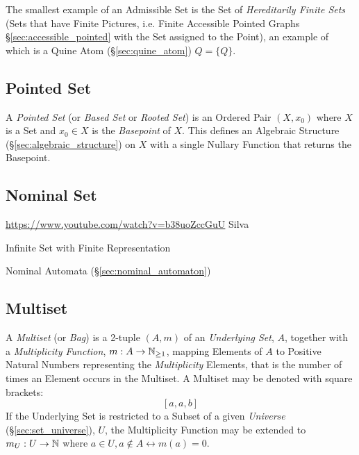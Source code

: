 The smallest example of an Admissible Set is the Set of \emph{Hereditarily
  Finite Sets} (Sets that have Finite Pictures, i.e. Finite Accessible Pointed
Graphs \S\ref{sec:accessible_pointed} with the Set assigned to the Point), an
example of which is a Quine Atom (\S\ref{sec:quine_atom}) $Q = \{Q\}$.
\cite{aczel88} %



\subsection{Pointed Set}\label{sec:pointed_set}

A \emph{Pointed Set} (or \emph{Based Set} or \emph{Rooted Set}) is an Ordered
Pair $(X, x_0)$ where $X$ is a Set and $x_0 \in X$ is the \emph{Basepoint} of
$X$. This defines an Algebraic Structure (\S\ref{sec:algebraic_structure}) on
$X$ with a single Nullary Function that returns the Basepoint.



\subsection{Nominal Set}\label{sec:nominal_set}

\url{https://www.youtube.com/watch?v=b38uoZccGuU} Silva

Infinite Set with Finite Representation

Nominal Automata (\S\ref{sec:nominal_automaton})



\subsection{Multiset}\label{sec:multiset}

A \emph{Multiset} (or \emph{Bag}) is a 2-tuple $(A,m)$ of an
\emph{Underlying Set}, $A$, together with a \emph{Multiplicity
  Function}, $m : A \to \mathbb{N}_{\geq 1}$, mapping Elements
of $A$ to Positive Natural Numbers representing the
\emph{Multiplicity} Elements, that is the number of times an Element
occurs in the Multiset. A Multiset may be denoted with square
brackets:
\[
  [a,a,b]
\]
If the Underlying Set is restricted to a Subset of a given
\emph{Universe} (\S\ref{sec:set_universe}), $U$, the Multiplicity
Function may be extended to $m_U : U \to \mathbb{N}$ where $a \in
U, a \notin A \leftrightarrow m(a)=0$.

